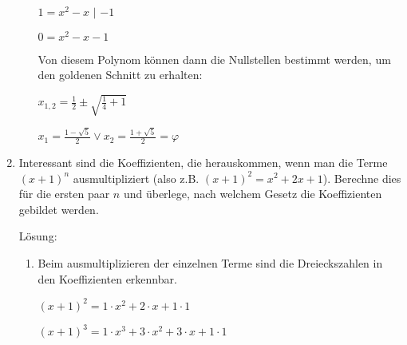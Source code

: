 \documentclass[../main.tex]{subfiles}
\begin{document}
\begin{enumerate}
\begin{enumerate}
		            \begin{math}
			            1
			            = x^2 - x
		            \end{math}
		            \(|\) \begin{math}
			            -1
		            \end{math}

		            \begin{math}
			            0 = x^2 - x - 1
		            \end{math}

		            Von diesem Polynom können dann die Nullstellen bestimmt werden, um den goldenen Schnitt zu erhalten:

		            \begin{math}
			            x_{1,2} = \frac{1}{2} \pm \sqrt{
				            \frac{1}{4} + 1
			            }
		            \end{math}

		            \begin{math}
			            x_1 = \frac{1 - \sqrt{5}}{2} \lor
			            x_2 = \frac{1 + \sqrt{5}}{2} = \varphi
		            \end{math}
	      \end{enumerate}
	\item Interessant sind die Koeffizienten, die herauskommen, wenn man die Terme \begin{math}
		      (x + 1)^n
	      \end{math} ausmultipliziert (also z.B. \begin{math}
		      (x + 1)^2 = x^2 + 2x + 1
	      \end{math}).
	      Berechne dies für die ersten paar \begin{math}
		      n
	      \end{math} und überlege, nach welchem Gesetz die Koeffizienten gebildet werden.

	      Lösung:
	      \begin{enumerate}
		      \item Beim ausmultiplizieren der einzelnen Terme sind die Dreieckszahlen in den Koeffizienten erkennbar.

		            \begin{math}
			            (x + 1)^2 = 1 \cdot x^2 + 2 \cdot x + 1 \cdot 1
		            \end{math}

		            \begin{math}
			            (x + 1)^3 = 1 \cdot x^3 + 3 \cdot x^2 + 3 \cdot x + 1 \cdot 1
		            \end{math}


\end{enumerate}
\end{enumerate}
\end{document}
